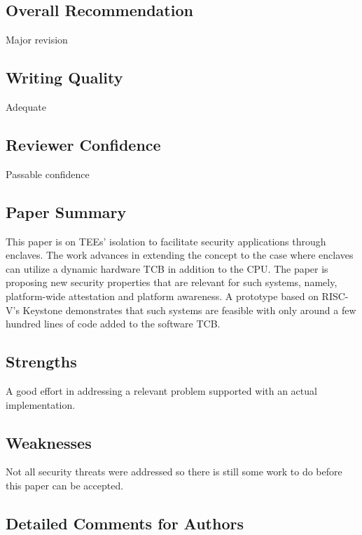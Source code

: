 \documentclass[9pt]{article}
\begin{document}
\subsection{Overall Recommendation}


  Major revision


\subsection{Writing Quality}


  Adequate


\subsection{Reviewer Confidence}


  Passable confidence


\subsection{Paper Summary}

This paper is on TEEs' isolation to facilitate security applications
through enclaves. The work advances in extending the concept to the case
where enclaves can utilize a dynamic hardware TCB in addition to the
CPU. The paper is proposing new security properties that are relevant
for such systems, namely, platform-wide attestation and platform
awareness. A prototype based on RISC-V's Keystone demonstrates that such
systems are feasible with only around a few hundred lines of code added
to the software TCB.

\subsection{Strengths}

A good effort in addressing a relevant problem supported with an actual
implementation.

\subsection{Weaknesses}

Not all security threats were addressed so there is still some work to
do before this paper can be accepted.

\subsection{Detailed Comments for Authors}
\end{document}
